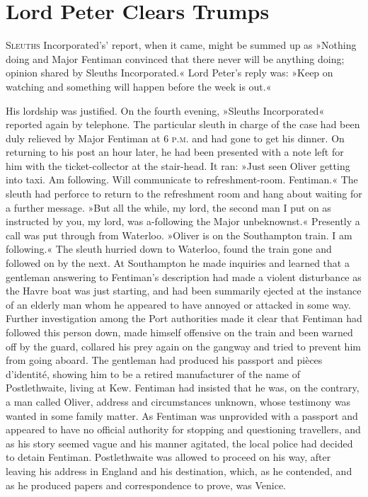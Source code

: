 \chapter{Lord Peter Clears Trumps}
\lettrine[lines=4,ante=‘]{S}{leuths} Incorporated's' report, when it came, might be summed up as »Nothing doing and Major Fentiman convinced that there never will be anything doing; opinion shared by Sleuths Incorporated.« Lord Peter's reply was: »Keep on watching and something will happen before the week is out.«

His lordship was justified. On the fourth evening, »Sleuths Incorporated« reported again by telephone. The particular sleuth in charge of the case had been duly relieved by Major Fentiman at 6 \textsc{p.m.} and had gone to get his dinner. On returning to his post an hour later, he had been presented with a note left for him with the ticket-collector at the stair-head. It ran: »Just seen Oliver getting into taxi. Am following. Will communicate to refreshment-room. Fentiman.« The sleuth had perforce to return to the refreshment room and hang about waiting for a further message. »But all the while, my lord, the second man I put on as instructed by you, my lord, was a-following the Major unbeknownst.« Presently a call was put through from Waterloo. »Oliver is on the Southampton train. I am following.« The sleuth hurried down to Waterloo, found the train gone and followed on by the next. At Southampton he made inquiries and learned that a gentleman answering to Fentiman's description had made a violent disturbance as the Havre boat was just starting, and had been summarily ejected at the instance of an elderly man whom he appeared to have annoyed or attacked in some way. Further investigation among the Port authorities made it clear that Fentiman had followed this person down, made himself offensive on the train and been warned off by the guard, collared his prey again on the gangway and tried to prevent him from going aboard. The gentleman had produced his passport and pièces d'identité, showing him to be a retired manufacturer of the name of Postlethwaite, living at Kew. Fentiman had insisted that he was, on the contrary, a man called Oliver, address and circumstances unknown, whose testimony was wanted in some family matter. As Fentiman was unprovided with a passport and appeared to have no official authority for stopping and questioning travellers, and as his story seemed vague and his manner agitated, the local police had decided to detain Fentiman. Postlethwaite was allowed to proceed on his way, after leaving his address in England and his destination, which, as he contended, and as he produced papers and correspondence to prove, was Venice.

